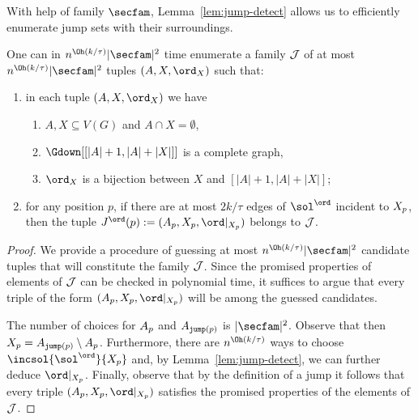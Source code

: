 With help of family $\secfam$, Lemma~\ref{lem:jump-detect} allows us to efficiently enumerate
jump sets with their surroundings.
\begin{theorem}\label{thm:jump-enum}
One can in $n^{\Oh(k/\tau)}|\secfam|^2$ time enumerate a family $\mathcal{J}$
of at most $n^{\Oh(k/\tau)}|\secfam|^2$ tuples $(A,X,\ord_X)$ such that:
\begin{enumerate}
\item in each tuple $(A,X,\ord_X)$ we have
\begin{enumerate}
\item $A,X \subseteq V(G)$ and $A \cap X = \emptyset$,
\item $\Gdown[[|A|+1,|A|+|X|]]$ is a complete graph,
\item $\ord_X$ is a bijection between $X$ and $[|A|+1,|A|+|X|]$;
\end{enumerate}
\item for any position $p$, if there are at most $2k/\tau$
edges of $\sol^\ord$ incident to $X_{p}$, then
the tuple $J^\ord(p) := (\secp{p},\jumpset{p},\ord|_{\jumpset{p}})$ belongs to $\mathcal{J}$.
\end{enumerate}
\end{theorem}
\begin{proof}
We provide a procedure of guessing at most $n^{\Oh(k/\tau)}|\secfam|^2$ candidate tuples that will constitute the family $\mathcal{J}$. Since the promised properties of elements of $\mathcal{J}$ can be checked in polynomial time, it suffices to argue that every triple of the form $(\secp{p},\jumpset{p},\ord|_{\jumpset{p}})$ will be among the guessed candidates.

The number of choices for $A_{p}$ and $A_{\mathtt{jump}(p)}$ is $|\secfam|^2$.
Observe that then $X_{p} = A_{\mathtt{jump}(p)} \setminus A_{p}$.
Furthermore, there are $n^{\Oh(k/\tau)}$ ways to choose $\incsol{\sol^\ord}{\jumpset{p}}$
and, by Lemma~\ref{lem:jump-detect}, we can further deduce $\ord|_{\jumpset{p}}$. Finally,  observe that  by the definition of a jump it follows that every triple $(\secp{p},\jumpset{p},\ord|_{\jumpset{p}})$ satisfies the promised properties of the elements of $\mathcal{J}$.
\end{proof}

